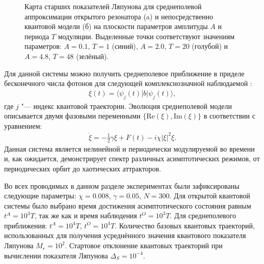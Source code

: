 \begin{figure}[h]
	\legend{}
	\caption[Карта старших показателей Ляпунова для открытого резонатора и его среднеполевой аппроксимации на плоскости параметров амплитуды и периода модуляции]
	{
		Карта старших показателей Ляпунова для среднеполевой аппроксимации открытого резонатора (a) и непосредственно квантовой модели (б) на плоскости параметров амплитуды $A$ и периода $T$ модуляции. Выделенные точки соответствуют значениям параметров: $A = 0.1$, $T = 1$ (синий), $A = 2.0$, $T = 20$ (голубой) и $A = 4.8$, $T = 48$ (зелёный).
	}
	\label{fig:pwtd_4}
\end{figure}

Для данной системы можно получить среднеполевое приближение в приделе бесконечного числа фотонов для следующей комплекснозначной наблюдаемой \cite{Spiller1994, Brun1996}:
\begin{equation}
	\label{eq:pwtd_obs}
	\begin{gathered}
		\xi(t) = \langle \psi_j(t)| b | \psi_j(t) \rangle,
	\end{gathered}
\end{equation}
где $j$ "--- индекс квантовой траектории. Эволюция среднеполевой модели описывается двумя фазовыми переменными $\{\text{Re}(\xi),\text{Im}(\xi)\}$ в соответствии с уравнением:
\begin{equation}
	\label{eq:pwtd_mean_field}
	\begin{gathered}
		\dot{\xi} = -\frac{1}{2}\gamma\xi + F(t) - i\chi|\xi|^2\xi.
	\end{gathered}
\end{equation}
Данная система является нелинейной и периодически модулируемой во времени и, как ожидается, демонстрирует спектр различных асимптотических режимов, от периодических орбит до хаотических аттракторов.

Во всех проводимых в данном разделе экспериментах были зафиксированы следующие параметры: $\chi=0.008$, $\gamma=0.05$, $N=300$. Для открытой квантовой системы было выбрано время достижения асимптотического состояния равным \(t^A = 10^3T\), так же как и время наблюдения \(t^O = 10^3T\). Для среднеполевого приближения: \(t^A = 10^4T\), \(t^O = 10^4T\). Количество базовых квантовых траекторий, использованных для получения усреднённого значения квантового показателя Ляпунова $M_r=10^2$. Стартовое отклонение квантовых траекторий при вычислении показателя Ляпунова $\Delta_S = 10^{-4}$.

